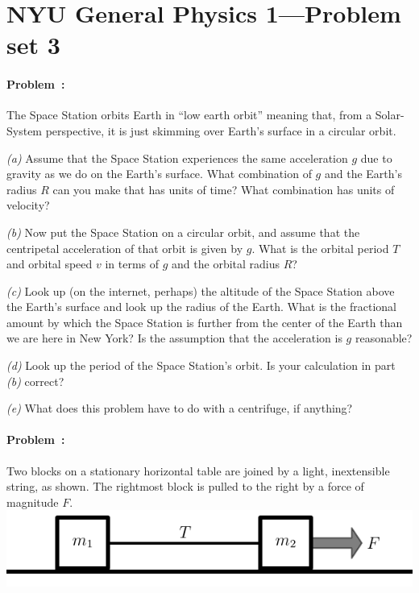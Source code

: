 \documentclass[12pt]{article}
\begin{document}
\thispagestyle{empty}

\section*{NYU General Physics 1---Problem set 3}

\paragraph{Problem~\theproblem:}%
The Space Station orbits Earth in ``low earth orbit'' meaning that,
from a Solar-System perspective, it is just skimming over Earth's
surface in a circular orbit.

\textsl{(a)} Assume that the Space Station experiences the same
acceleration $g$ due to gravity as we do on the Earth's surface.  What
combination of $g$ and the Earth's radius $R$ can you make that has
units of time?  What combination has units of velocity?

\textsl{(b)} Now put the Space Station on a circular orbit, and assume
that the centripetal acceleration of that orbit is given by $g$.  What
is the orbital period $T$ and orbital speed $v$ in terms of $g$ and the
orbital radius $R$?

\textsl{(c)} Look up (on the internet, perhaps) the altitude of the
Space Station above the Earth's surface and look up the radius of the
Earth.  What is the fractional amount by which the Space Station is
further from the center of the Earth than we are here in New York?  Is
the assumption that the acceleration is $g$ reasonable?

\textsl{(d)} Look up the period of the Space Station's orbit.  Is your
calculation in part \textsl{(b)} correct?

\textsl{(e)} What does this problem have to do with a centrifuge, if
anything?

\paragraph{Problem~\theproblem:}%
Two blocks on a stationary horizontal table are joined by a light,
inextensible string, as shown.  The rightmost block is pulled to the
right by a force of magnitude
$F$.\\ \includegraphics{../py/stringblocks.pdf}
\end{document}
